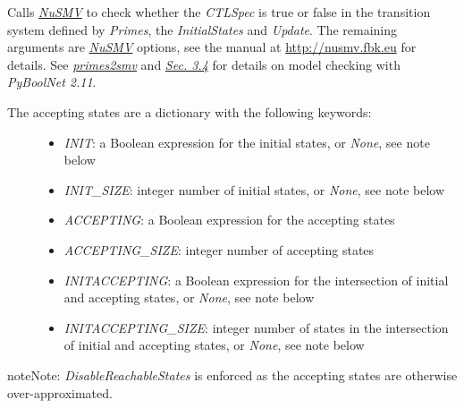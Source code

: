 \documentclass[letterpaper,10pt,english]{sphinxmanual}
\begin{document}
\begin{fulllineitems}
\label{ModelChecking:PyBoolNet.ModelChecking.check_primes_with_acceptingstates}
Calls {\hyperref[Installation:installation-nusmv]{\emph{NuSMV}}} to check whether the \emph{CTLSpec} is true or false in the transition system defined by \emph{Primes},
the \emph{InitialStates} and \emph{Update}.
The remaining arguments are {\hyperref[Installation:installation-nusmv]{\emph{NuSMV}}} options, see the manual at \href{http://nusmv.fbk.eu}{http://nusmv.fbk.eu} for details.
See {\hyperref[ModelChecking:primes2smv]{\emph{primes2smv}}} and {\hyperref[Manual:sec-model-checking]{\emph{Sec. 3.4}}} for details on model checking with \emph{PyBoolNet 2.11}.
\begin{description}
\item[{The accepting states are a dictionary with the following keywords:}] \leavevmode\begin{itemize}
\item {} 
\emph{INIT}: a Boolean expression for the initial states, or \emph{None}, see note below

\item {} 
\emph{INIT\_SIZE}: integer number of initial states, or \emph{None}, see note below

\item {} 
\emph{ACCEPTING}: a Boolean expression for the accepting states

\item {} 
\emph{ACCEPTING\_SIZE}: integer number of accepting states

\item {} 
\emph{INITACCEPTING}: a Boolean expression for the intersection of initial and accepting states, or \emph{None}, see note below

\item {} 
\emph{INITACCEPTING\_SIZE}: integer number of states in the intersection of initial and accepting states, or \emph{None}, see note below

\end{itemize}

\end{description}

\begin{notice}{note}{Note:}
\emph{DisableReachableStates} is enforced as the accepting states are otherwise over-approximated.
\end{notice}


\end{fulllineitems}
\end{document}
